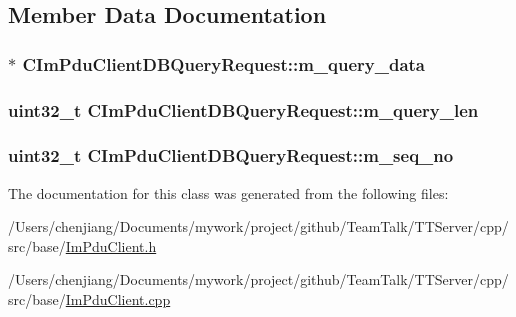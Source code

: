 \subsection{Member Data Documentation}
\hypertarget{class_c_im_pdu_client_d_b_query_request_a894a828b80c7b797d1349388256f82de}{}
\subsubsection[{m\+\_\+query\+\_\+data}]{$\ast$ C\+Im\+Pdu\+Client\+D\+B\+Query\+Request\+::m\+\_\+query\+\_\+data\hspace{0.3cm}{\ttfamily [private]}}\label{class_c_im_pdu_client_d_b_query_request_a894a828b80c7b797d1349388256f82de}
\hypertarget{class_c_im_pdu_client_d_b_query_request_a4566ebacf9aebe98b7d7f7318fde71d4}{}
\subsubsection[{m\+\_\+query\+\_\+len}]{\setlength{\rightskip}{0pt plus 5cm}uint32\+\_\+t C\+Im\+Pdu\+Client\+D\+B\+Query\+Request\+::m\+\_\+query\+\_\+len\hspace{0.3cm}{\ttfamily [private]}}\label{class_c_im_pdu_client_d_b_query_request_a4566ebacf9aebe98b7d7f7318fde71d4}
\hypertarget{class_c_im_pdu_client_d_b_query_request_a8793302f9365d1f954189e8850ff7438}{}
\subsubsection[{m\+\_\+seq\+\_\+no}]{\setlength{\rightskip}{0pt plus 5cm}uint32\+\_\+t C\+Im\+Pdu\+Client\+D\+B\+Query\+Request\+::m\+\_\+seq\+\_\+no\hspace{0.3cm}{\ttfamily [private]}}\label{class_c_im_pdu_client_d_b_query_request_a8793302f9365d1f954189e8850ff7438}


The documentation for this class was generated from the following files\+:\begin{DoxyCompactItemize}
\item 
/\+Users/chenjiang/\+Documents/mywork/project/github/\+Team\+Talk/\+T\+T\+Server/cpp/src/base/\hyperlink{_im_pdu_client_8h}{Im\+Pdu\+Client.\+h}\item 
/\+Users/chenjiang/\+Documents/mywork/project/github/\+Team\+Talk/\+T\+T\+Server/cpp/src/base/\hyperlink{_im_pdu_client_8cpp}{Im\+Pdu\+Client.\+cpp}\end{DoxyCompactItemize}
